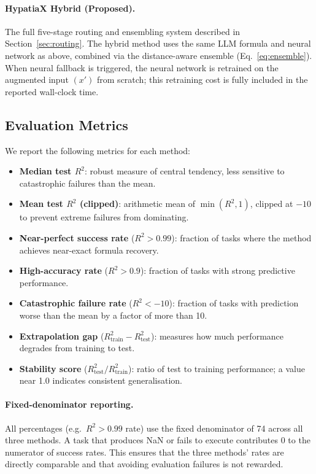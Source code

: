 \documentclass[twoside,11pt]{article}
\newcommand{\Rsq}{R^{2}}
\newcommand{\Rtrain}{R^{2}_{\mathrm{train}}}
\newcommand{\Rtest}{R^{2}_{\mathrm{test}}}
\begin{document}
\paragraph{HypatiaX Hybrid (Proposed).}
The full five-stage routing and ensembling system described in Section~\ref{sec:routing}.
The hybrid method uses the same LLM formula and neural network as above, combined via
the distance-aware ensemble (Eq.~\ref{eq:ensemble}).  When neural fallback is triggered,
the neural network is retrained on the augmented input $(x')$ from scratch; this
retraining cost is fully included in the reported wall-clock time.

\subsection{Evaluation Metrics}\label{subsec:evaluation-metrics}
\label{sec:setup_metrics}

We report the following metrics for each method:
\begin{itemize}
  \item \textbf{Median test $\Rsq$}: robust measure of central tendency, less
    sensitive to catastrophic failures than the mean.
  \item \textbf{Mean test $\Rsq$ (clipped)}: arithmetic mean of $\min(\Rsq, 1)$,
    clipped at $-10$ to prevent extreme failures from dominating.
  \item \textbf{Near-perfect success rate} ($\Rsq > 0.99$): fraction of tasks where
    the method achieves near-exact formula recovery.
  \item \textbf{High-accuracy rate} ($\Rsq > 0.9$): fraction of tasks with strong
    predictive performance.
  \item \textbf{Catastrophic failure rate} ($\Rsq < -10$): fraction of tasks with
    prediction worse than the mean by a factor of more than 10.
  \item \textbf{Extrapolation gap} ($\Rtrain - \Rtest$): measures how much
    performance degrades from training to test.
  \item \textbf{Stability score} ($\Rtest / \Rtrain$): ratio of test to training
    performance; a value near 1.0 indicates consistent generalisation.
\end{itemize}

\paragraph{Fixed-denominator reporting.}
All percentages (e.g.\ $\Rsq > 0.99$ rate) use the fixed denominator of 74 across
all three methods.  A task that produces NaN or fails to execute contributes 0 to
the numerator of success rates.  This ensures that the three methods' rates are
directly comparable and that avoiding evaluation failures is not rewarded.
\end{document}
